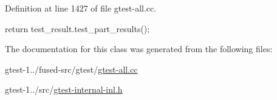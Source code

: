 \-Definition at line 1427 of file gtest-\/all.\-cc.


\begin{DoxyCode}
                                     {
    return test_result.test_part_results();
  }
\end{DoxyCode}


\-The documentation for this class was generated from the following files\-:\begin{DoxyCompactItemize}
\item 
gtest-\/1../fused-\/src/gtest/\hyperlink{fused-src_2gtest_2gtest-all_8cc}{gtest-\/all.\-cc}\item 
gtest-\/1../src/\hyperlink{gtest-internal-inl_8h}{gtest-\/internal-\/inl.\-h}\end{DoxyCompactItemize}
